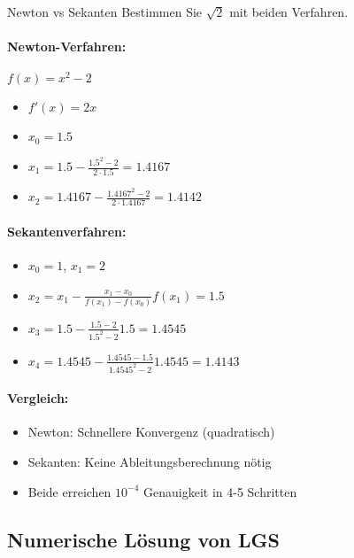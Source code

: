 \begin{example2}{Newton vs Sekanten}
Bestimmen Sie $\sqrt{2}$ mit beiden Verfahren.

\paragraph{Newton-Verfahren:} $f(x) = x^2-2$
\begin{itemize}
    \item $f'(x) = 2x$
    \item $x_0 = 1.5$
    \item $x_1 = 1.5 - \frac{1.5^2-2}{2\cdot1.5} = 1.4167$
    \item $x_2 = 1.4167 - \frac{1.4167^2-2}{2\cdot1.4167} = 1.4142$
\end{itemize}

\paragraph{Sekantenverfahren:}
\begin{itemize}
    \item $x_0 = 1$, $x_1 = 2$
    \item $x_2 = x_1 - \frac{x_1-x_0}{f(x_1)-f(x_0)}f(x_1) = 1.5$
    \item $x_3 = 1.5 - \frac{1.5-2}{1.5^2-2}1.5 = 1.4545$
    \item $x_4 = 1.4545 - \frac{1.4545-1.5}{1.4545^2-2}1.4545 = 1.4143$
\end{itemize}

\paragraph{Vergleich:}
\begin{itemize}
    \item Newton: Schnellere Konvergenz (quadratisch)
    \item Sekanten: Keine Ableitungsberechnung nötig
    \item Beide erreichen $10^{-4}$ Genauigkeit in 4-5 Schritten
\end{itemize}
\end{example2}

\subsection{Numerische Lösung von LGS}

